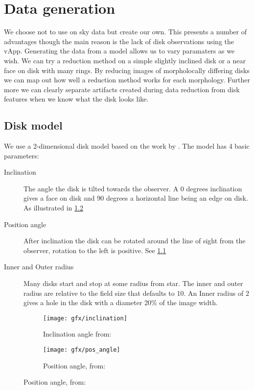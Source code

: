 
\chapter{Data generation} %
\label{ch:data_gen} %

We choose not to use on sky data but create our own. This presents a number of advantages though the main reason is the lack of disk observations using the vApp. Generating the data from a model allows us to vary paramaters as we wish. We can try a reduction method on a simple slightly inclined disk or a near face on disk with many rings. By reducing images of morpholocally differing disks we can map out how well a reduction method works for each morphology. Further more we can clearly separate artifacts created during data reduction from disk features when we know what the disk looks like.





\section{Disk model}

We use a 2-dimensional disk model based on the work by \cite{Pieter_Okko}. The model has 4 basic parameters: 

\begin{description}
\item[Inclination] The angle the disk is tilted towards the observer. A 0 degrees inclination gives a face on disk and 90 degrees a horizontal line being an edge on disk. As illustrated in \ref{fig:inclination}
\item[Position angle] After inclination the disk can be rotated around the line of sight from the observer, rotation to the left is positive. See \ref{fig:pos_angle}
\item[Inner and Outer radius] Many disks start and stop at some radius from star. The inner and outer radius are relative to the field size that defaults to 10. An Inner radius of 2 gives a hole in the disk with a diameter 20\% of the image width. 
\end{description}

\begin{figure}[h!]
  \centering
  \begin{subfigure}[b]{0.4\textwidth}
    \texttt{[image: gfx/inclination]}\label{fig:pos_angle}
    \caption{Inclination angle from: \cite{Pieter_Okko}}

  \end{subfigure}
  \begin{subfigure}[b]{0.4\textwidth}
    \texttt{[image: gfx/pos\_angle]}\label{fig:inclination}
    \caption{Position angle, from: \cite{Pieter_Okko}}
  \end{subfigure}
  \label{fig:1}
\end{figure}

